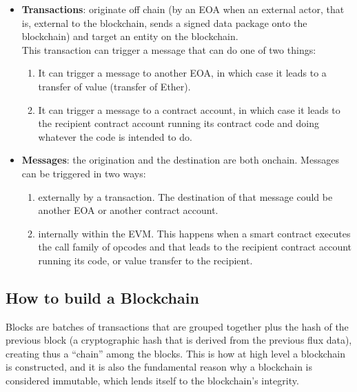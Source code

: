 \begin{itemize}
    
    \item\textbf{Transactions}: originate off chain (by an EOA when an external actor, that is, external to the blockchain, sends a signed data package onto the blockchain) and target an entity on the blockchain.\\
    
    This transaction can trigger a message that can do one of two things:

    \begin{enumerate}

        \item It can trigger a message to another EOA, in which case it leads to a transfer of value (transfer of Ether).

        \item It can trigger a message to a contract account, in which case it leads to the recipient contract account running its contract code and doing whatever the code is intended to do.

    \end{enumerate}    
    
    \item\textbf{Messages}: the origination and the destination are both onchain.
    Messages can be triggered in two ways:

    \begin{enumerate}

        \item externally by a transaction.
        The destination of that message could be another EOA or another contract account.

        \item internally within the EVM.
        This happens when a smart contract executes the call family of opcodes and that leads to the recipient contract account running its code, or value transfer to the recipient.

    \end{enumerate}

\end{itemize}

\subsection*{How to build a Blockchain}

Blocks are batches of transactions that are grouped together plus the hash of the previous block (a cryptographic hash that is derived from the previous flux data), creating thus a ``chain'' among the blocks.
This is how at high level a blockchain is constructed, and it is also the fundamental reason why a blockchain is considered immutable, which lends itself to the blockchain's integrity.\\

